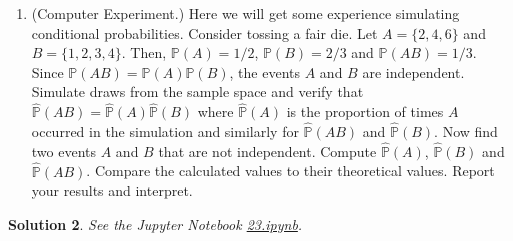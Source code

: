 \documentclass[10pt]{article}
\newtheorem*{sol}{Solution}
\renewcommand{\P}{\mathbb{P}}
\begin{document}
\begin{enumerate}
\begin{sol}
See the Jupyter Notebook
\href{https://github.com/ajrasmus/some_of_statistics/blob/main/chapter_1/22.ipynb}{22.ipynb}.
\end{sol}

\item[(23)] (Computer Experiment.) Here we will get some experience simulating
conditional probabilities. Consider tossing a fair die. Let $A = \{2, 4, 6\}$
and $B = \{1, 2, 3, 4\}$. Then, $\P(A) = 1/2$, $\P(B) = 2/3$ and
$\P(AB) = 1/3$. Since $\P(AB) = \P(A)\P(B)$, the events $A$ and $B$ are
independent. Simulate draws from the sample space and verify that
$\hat{\P}(AB) = \hat{\P}(A)\hat{\P}(B)$ where $\hat{\P}(A)$
is the proportion of times $A$ occurred in the simulation and
similarly for $\hat{\P}(AB)$ and $\hat{\P}(B)$. Now find two events
$A$ and $B$ that are not independent. Compute $\hat{\P}(A)$, $\hat{\P}(B)$
and $\hat{\P}(AB)$. Compare the calculated
values to their theoretical values. Report your results and interpret.
\end{enumerate}

\begin{sol}
See the Jupyter Notebook
\href{https://github.com/ajrasmus/some_of_statistics/blob/main/chapter_1/23.ipynb}{23.ipynb}.
\end{sol}
\end{document}
